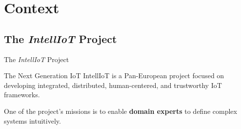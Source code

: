 \section{Context}

\subsection{The \textit{IntellIoT} Project}

\begin{frame}{The \textit{IntellIoT} Project}
    \begin{block}{The Next Generation IoT}
        IntellIoT is a Pan-European project focused on developing integrated, distributed, human-centered, and trustworthy IoT frameworks.
    \end{block}

    \vspace{1.5cm}

    One of the project's missions is to enable \textbf{domain experts} to define complex systems intuitively.
\end{frame}